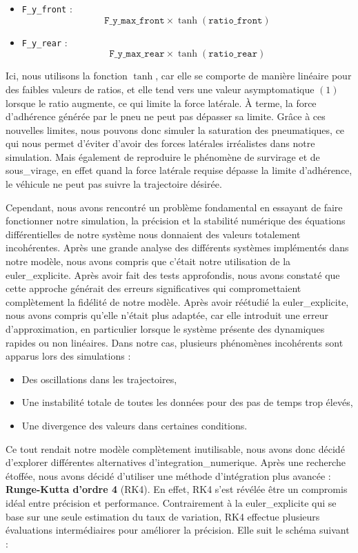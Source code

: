 \begin{itemize}
    \item \texttt{F\_y\_front} : $$\texttt{F\_y\_max\_front} \times \tanh(\texttt{ratio\_front})$$
    \item \texttt{F\_y\_rear} : $$\texttt{F\_y\_max\_rear} \times \tanh(\texttt{ratio\_rear})$$
\end{itemize}

Ici, nous utilisons la fonction $\tanh$, car elle se comporte de manière linéaire pour des faibles valeurs de ratios, et elle tend vers une valeur asymptomatique $(1)$ lorsque le ratio augmente, ce qui limite la force latérale.
À terme, la force d'adhérence générée par le pneu ne peut pas dépasser sa limite.
Grâce à ces nouvelles limites, nous pouvons donc simuler la saturation des pneumatiques, ce qui nous permet d'éviter d'avoir des forces latérales irréalistes dans notre simulation.
Mais également de reproduire le phénomène de \gls{survirage} et de \gls{sous_virage}, en effet quand la force latérale requise dépasse la limite d'adhérence, le véhicule ne peut pas suivre la trajectoire désirée.

Cependant, nous avons rencontré un problème fondamental en essayant de faire fonctionner notre simulation, la précision et la stabilité numérique des équations différentielles de notre système nous donnaient des valeurs totalement incohérentes.
Après une grande analyse des différents systèmes implémentés dans notre modèle, nous avons compris que c'était notre utilisation de la \gls{euler_explicite}.
Après avoir fait des tests approfondis, nous avons constaté que cette approche générait des erreurs significatives qui compromettaient complètement la fidélité de notre modèle.
Après avoir réétudié la \gls{euler_explicite}, nous avons compris qu'elle n'était plus adaptée, car elle introduit une erreur d'approximation, en particulier lorsque le système présente des dynamiques rapides ou non linéaires.
Dans notre cas, plusieurs phénomènes incohérents sont apparus lors des simulations :
\begin{itemize}
    \item Des oscillations dans les trajectoires,
    \item Une instabilité totale de toutes les données pour des pas de temps trop élevés,
    \item Une divergence des valeurs dans certaines conditions.
\end{itemize}
Ce tout rendait notre modèle complètement inutilisable, nous avons donc décidé d'explorer différentes alternatives d'\gls{integration_numerique}.
Après une recherche étoffée, nous avons décidé d'utiliser une méthode d'intégration plus avancée : \textbf{Runge-Kutta d'ordre 4} (RK4).
En effet, RK4 s'est révélée être un compromis idéal entre précision et performance.
Contrairement à la \gls{euler_explicite} qui se base sur une seule estimation du taux de variation, RK4 effectue plusieurs évaluations intermédiaires pour améliorer la précision.
Elle suit le schéma suivant :

